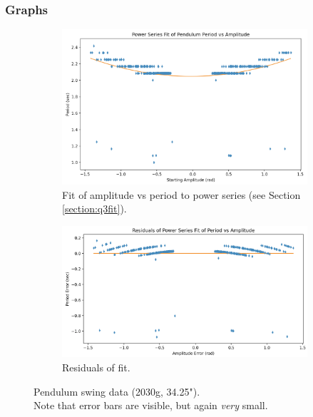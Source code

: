 \documentclass[12pt]{article}
\begin{document}
\subsubsection{Graphs}
\begin{figure}[h]
    \centering
    \begin{subfigure}[b]{0.48\textwidth}
        \centering
        \includegraphics[width=\textwidth]{q3_fit.png}
        \caption{Fit of amplitude vs period to power series (see Section \ref{section:q3fit}).}
        \label{fig:q3fit}
    \end{subfigure}
    \hfill
    \begin{subfigure}[b]{0.48\textwidth}
        \centering
        \includegraphics[width=\textwidth]{q3_residuals.png}
        \caption{Residuals of fit.}
        \label{fig:q3residuals}
    \end{subfigure}
    \hfill
    \caption{Pendulum swing data (2030g, 34.25"). \\Note that error bars are visible, but again \emph{very} small.}
    \label{fig:q3fig}
\end{figure}
\end{document}
